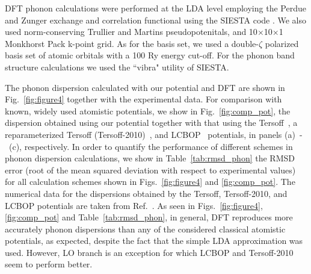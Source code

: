 \documentclass[aps,prb,floatfix,twocolumn,showpacs]{revtex4}
\begin{document}
DFT phonon calculations were performed at the LDA level employing the 
Perdue and Zunger\cite{PZ} exchange and correlation functional using
the SIESTA code \cite{siesta1, siesta2}.
We also used norm-conserving Trullier and Martins pseudopotenitals\cite{TM_pseudo}, 
and 10$\times$10$\times$1 Monkhorst Pack k-point grid. As for the basis set, we used a
double-$\zeta$ polarized basis set of atomic orbitals with a 100 Ry energy
cut-off.  For the phonon band structure 
calculations we used the ``vibra" utility of SIESTA.

The phonon dispersion calculated with our potential and DFT are shown in
Fig.~\ref{fig:figure4} together with the experimental data.
For comparison with known, widely used atomistic potentials, we show in Fig.~\ref{fig:comp_pot},
the dispersion obtained using our potential together with that using the Tersoff~\cite{Tersoff,Tersoff1},
a reparameterized Tersoff (Tersoff-2010)~\cite{T2010}, and LCBOP~\cite{LCBOP} potentials, in panels
(a)~-~(c), respectively. In order to quantify the performance of different schemes in phonon dispersion calculations,
we show in Table~\ref{tab:rmsd_phon} the RMSD error (root of the mean squared deviation with respect to
experimental values)  for all calculation schemes shown in Figs.~\ref{fig:figure4} 
and \ref{fig:comp_pot}. 
The numerical data for the dispersions obtained by the Tersoff, Tersoff-2010, and LCBOP potentials are taken from
Ref.~. As seen in Figs.~\ref{fig:figure4}, \ref{fig:comp_pot} and
Table~\ref{tab:rmsd_phon}, in general, DFT reproduces more accurately phonon dispersions than any
of the considered classical atomistic potentials, as expected, 
despite the fact that the simple LDA approximation was used. However, LO branch is an exception 
for which LCBOP and Tersoff-2010 seem to perform better.
\end{document}
